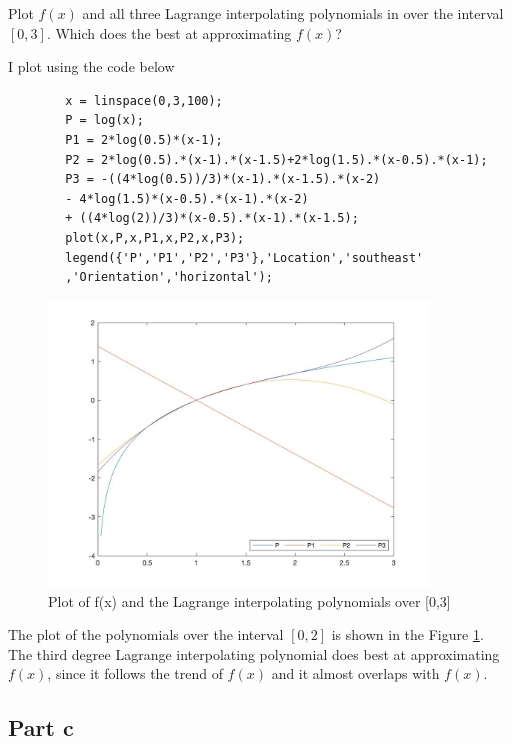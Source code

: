 \begin{question}
    Plot $f(x)$ and all three Lagrange interpolating polynomials in \MATLAB over the interval $[0,3]$. Which does the best at approximating $f(x)$?
\end{question}

\begin{answer}
    I plot using the code below
    \begin{verbatim}
        x = linspace(0,3,100);
        P = log(x);
        P1 = 2*log(0.5)*(x-1);
        P2 = 2*log(0.5).*(x-1).*(x-1.5)+2*log(1.5).*(x-0.5).*(x-1);
        P3 = -((4*log(0.5))/3)*(x-1).*(x-1.5).*(x-2) 
        - 4*log(1.5)*(x-0.5).*(x-1).*(x-2) 
        + ((4*log(2))/3)*(x-0.5).*(x-1).*(x-1.5);
        plot(x,P,x,P1,x,P2,x,P3);
        legend({'P','P1','P2','P3'},'Location','southeast'
        ,'Orientation','horizontal');
    \end{verbatim}
    \begin{figure}[H]
        \centering
        \includegraphics[width=0.9\textwidth]{Figure 5.jpg}
        \caption{\label{fig:fig5}Plot of f(x) and the Lagrange interpolating polynomials over [0,3]}
    \end{figure}
    The plot of the polynomials over the interval $[0,2]$ is shown in the Figure \ref{fig:fig5}. The third degree Lagrange interpolating polynomial does best at approximating $f(x)$, since it follows the trend of $f(x)$ and it almost overlaps with $f(x)$.
\end{answer}

\subsection{Part c}

